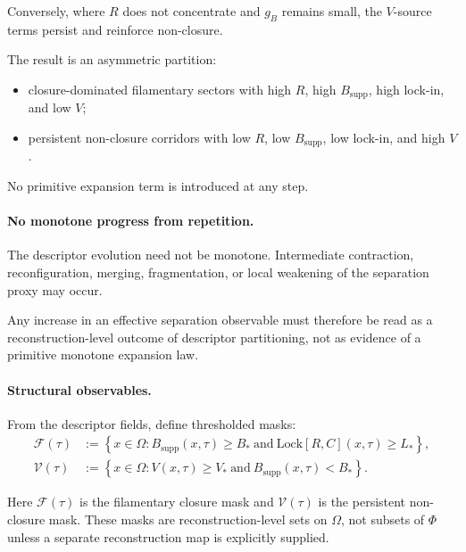 \documentclass[aps,prx,onecolumn,11pt]{revtex4-2}
\theoremstyle{plain}
\theoremstyle{definition}
\theoremstyle{remark}
\begin{document}
Conversely, where \(R\) does not concentrate and \(g_B\) remains small,
the \(V\)-source terms persist and reinforce non-closure.

The result is an asymmetric partition:

\begin{itemize}
\item closure-dominated filamentary sectors with high \(R\), high
\(B_{\mathrm{supp}}\), high lock-in, and low \(V\);
\item persistent non-closure corridors with low \(R\), low
\(B_{\mathrm{supp}}\), low lock-in, and high \(V\).
\end{itemize}

No primitive expansion term is introduced at any step.

\paragraph{No monotone progress from repetition.}

The descriptor evolution need not be monotone. Intermediate contraction,
reconfiguration, merging, fragmentation, or local weakening of the
separation proxy may occur.

Any increase in an effective separation observable must therefore be
read as a reconstruction-level outcome of descriptor partitioning, not
as evidence of a primitive monotone expansion law.

\paragraph{Structural observables.}

From the descriptor fields, define thresholded masks:
\begin{align}
\mathcal F(\tau)
&:=
\left\{
x\in\Omega:
B_{\mathrm{supp}}(x,\tau)\geq B_\ast
\ \text{and}\
\mathrm{Lock}[R,C](x,\tau)\geq L_\ast
\right\},
\label{eq:toy_sep_filament_mask}
\\[0.5em]
\mathcal V(\tau)
&:=
\left\{
x\in\Omega:
V(x,\tau)\geq V_\ast
\ \text{and}\
B_{\mathrm{supp}}(x,\tau)<B_\ast
\right\}.
\label{eq:toy_sep_nonclosure_mask}
\end{align}

Here \(\mathcal F(\tau)\) is the filamentary closure mask and
\(\mathcal V(\tau)\) is the persistent non-closure mask. These masks are
reconstruction-level sets on \(\Omega\), not subsets of \(\Phi\) unless
a separate reconstruction map is explicitly supplied.
\end{document}
